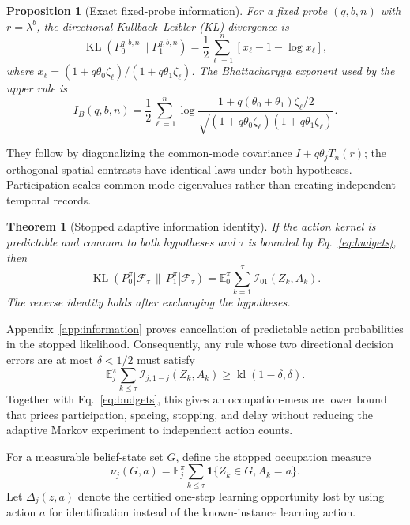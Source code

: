 \documentclass[journal]{IEEEtran}
\newtheorem{theorem}{Theorem}
\newtheorem{proposition}{Proposition}
\newcommand{\E}{\mathbb{E}}
\newcommand{\F}{\mathcal{F}}
\newcommand{\KL}{\operatorname{KL}}
\begin{document}
\begin{proposition}[Exact fixed-probe information]
For a fixed probe $(q,b,n)$ with $r=\lambda^b$, the directional Kullback--Leibler (KL) divergence is
\begin{equation}
\KL(P_0^{q,b,n}\|P_1^{q,b,n})
=\frac12\sum_{\ell=1}^n
\left[x_\ell-1-\log x_\ell\right],
\label{eq:fixed-probe-kl}
\end{equation}
where $x_\ell=(1+q\theta_0\zeta_\ell)/(1+q\theta_1\zeta_\ell)$.
The Bhattacharyya exponent used by the upper rule is
\begin{equation}
I_B(q,b,n)=\frac12\sum_{\ell=1}^n
\log\frac{1+q(\theta_0+\theta_1)\zeta_\ell/2}
{\sqrt{(1+q\theta_0\zeta_\ell)(1+q\theta_1\zeta_\ell)}}.
\label{eq:bhattacharyya}
\end{equation}
\label{prop:fixed-information}
\end{proposition}

They follow by diagonalizing the common-mode covariance $I+q\theta_jT_n(r)$; the orthogonal spatial contrasts have identical laws under both hypotheses.
Participation scales common-mode eigenvalues rather than creating independent temporal records.

\begin{theorem}[Stopped adaptive information identity]
If the action kernel is predictable and common to both hypotheses and $\tau$ is bounded by Eq.~\eqref{eq:budgets}, then
\begin{equation}
\KL(P_0^\pi|\F_\tau\,\|\,P_1^\pi|\F_\tau)=\E_0^\pi\sum_{k=1}^{\tau}\mathcal{I}_{01}(Z_k,A_k).
\label{eq:adaptive-kl}
\end{equation}
The reverse identity holds after exchanging the hypotheses.
\label{thm:adaptive-kl}
\end{theorem}
Appendix~\ref{app:information} proves cancellation of predictable action probabilities in the stopped likelihood.
Consequently, any rule whose two directional decision errors are at most $\delta<1/2$ must satisfy
\begin{equation}
\E_j^\pi\sum_{k\le\tau}\mathcal{I}_{j,1-j}(Z_k,A_k)\ge \operatorname{kl}(1-\delta,\delta).
\label{eq:info-constraint}
\end{equation}
Together with Eq.~\eqref{eq:budgets}, this gives an occupation-measure lower bound that prices participation, spacing, stopping, and delay without reducing the adaptive Markov experiment to independent action counts.

For a measurable belief-state set $G$, define the stopped occupation measure
\begin{equation}
\nu_j(G,a)=\E_j^\pi\sum_{k\le\tau}
\mathbf 1\{Z_k\in G,A_k=a\}.
\label{eq:occupation-measure}
\end{equation}
Let $\Delta_j(z,a)$ denote the certified one-step learning opportunity lost by using action $a$ for identification instead of the known-instance learning action.
\end{document}
